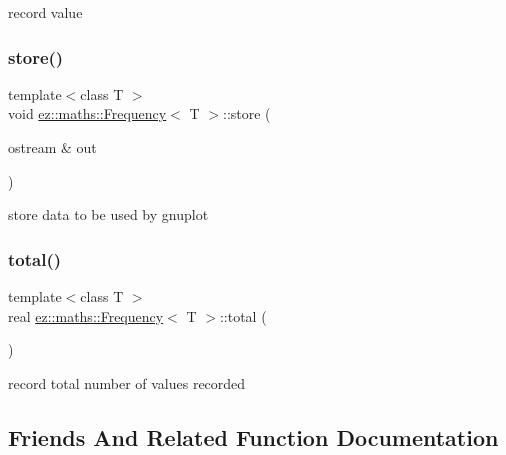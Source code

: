 record value \mbox{\label{classez_1_1maths_1_1Frequency_a102cd5f7b102ee433126fe809b2dfccb}} 
\subsubsection{\texorpdfstring{store()}{store()}}
{\footnotesize\ttfamily template$<$class T $>$ \\
void \hyperlink{classez_1_1maths_1_1Frequency}{ez\+::maths\+::\+Frequency}$<$ T $>$\+::store (\begin{DoxyParamCaption}\item[{ostream \&}]{out }\end{DoxyParamCaption})\hspace{0.3cm}{\ttfamily [inline]}}

store data to be used by gnuplot \mbox{\label{classez_1_1maths_1_1Frequency_aa18480ae307a14ad3a528476194d022e}} 
\subsubsection{\texorpdfstring{total()}{total()}}
{\footnotesize\ttfamily template$<$class T $>$ \\
real \hyperlink{classez_1_1maths_1_1Frequency}{ez\+::maths\+::\+Frequency}$<$ T $>$\+::total (\begin{DoxyParamCaption}{ }\end{DoxyParamCaption})\hspace{0.3cm}{\ttfamily [inline]}}

record total number of values recorded 

\subsection{Friends And Related Function Documentation}
\mbox{\label{classez_1_1maths_1_1Frequency_a0909af66272f86930b70857efb6c6a7e}} 
